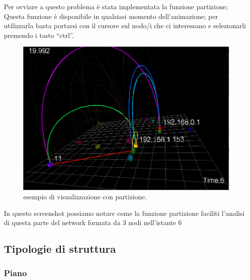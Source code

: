 \documentclass[a4paper,12pt]{article}
\begin{document}
Per ovviare a questo problema \`e stata implementata la funzione partizione; 
Questa funzione \`e disponibile  in qualsiasi momento dell'animazione; per utilizzarla basta portarsi con il cursore sul nodo/i che ci interessano e selezionarli premendo i tasto “ctrl”.

\begin{figure}[htb!]
 \begin{center}
  \includegraphics[width=\textwidth]{images/image3.png}
 \end{center}
 \caption{esempio di visualizzazione con  partizione.}
 \label{fig:slider}
\end{figure}
 
In questo screenshot possiamo notare come la funzione partizione faciliti l'analisi di questa parte del network formata da 3 nodi nell'istante 6 
 
\subsection{Tipologie di struttura}
 
\subsubsection{Piano}
\end{document}
